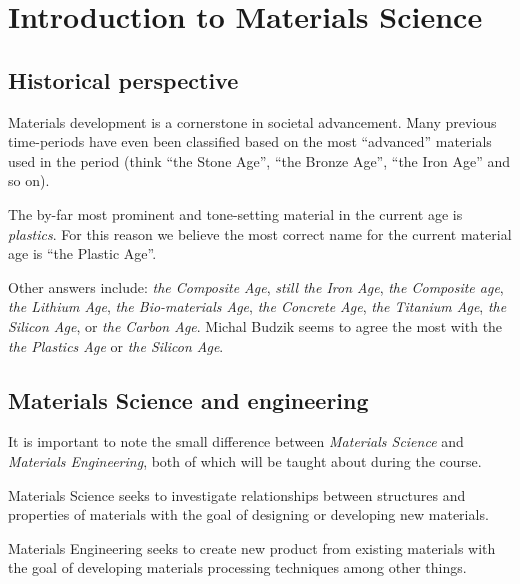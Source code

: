 
\section{Introduction to Materials Science}
\subsection{Historical perspective}
Materials development is a cornerstone in societal advancement. Many previous time-periods have even been classified based on the most ``advanced'' materials used in the period (think ``the Stone Age'', ``the Bronze Age'', ``the Iron Age'' and so on).

\begin{dis} %
  The by-far most prominent and tone-setting material in the current age is \textit{plastics}. For this reason we believe the most correct name for the current material age is ``the Plastic Age''.

  Other answers include: \textit{the Composite Age}, \textit{still the Iron Age}, \textit{the Composite age}, \textit{the Lithium Age}, \textit{the Bio-materials Age}, \textit{the Concrete Age}, \textit{the Titanium Age}, \textit{the Silicon Age}, or \textit{the Carbon Age}. Michal Budzik seems to agree the most with the \textit{the Plastics Age} or \textit{the Silicon Age}.
\end{dis}


\subsection{Materials Science and engineering}
It is important to note the small difference between \textit{Materials Science} and \textit{Materials Engineering}, both of which will be taught about during the course.

\begin{definition}
  Materials Science seeks to investigate relationships between structures and properties of materials with the goal of designing or developing new materials.
\end{definition}

\begin{definition}
  Materials Engineering seeks to create new product from existing materials with the goal of developing materials processing techniques among other things.
\end{definition}


